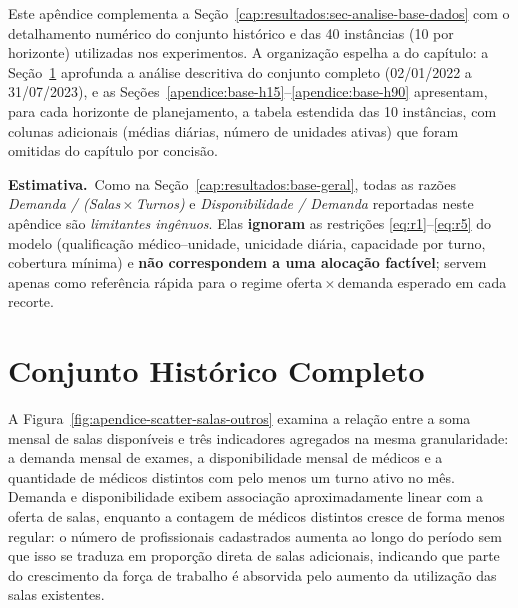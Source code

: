 Este apêndice complementa a Seção~\ref{cap:resultados:sec-analise-base-dados} com o detalhamento numérico do conjunto histórico e das 40 instâncias (10 por horizonte) utilizadas nos experimentos. A organização espelha a do capítulo: a Seção~\ref{apendice:base-geral-detalhe} aprofunda a análise descritiva do conjunto completo (02/01/2022 a 31/07/2023), e as Seções~\ref{apendice:base-h15}--\ref{apendice:base-h90} apresentam, para cada horizonte de planejamento, a tabela estendida das 10 instâncias, com colunas adicionais (médias diárias, número de unidades ativas) que foram omitidas do capítulo por concisão.

\noindent\textbf{Estimativa.}\, Como na Seção~\ref{cap:resultados:base-geral}, todas as razões \emph{Demanda / (Salas\,$\times$\,Turnos)} e \emph{Disponibilidade / Demanda} reportadas neste apêndice são \emph{limitantes ingênuos}. Elas \textbf{ignoram} as restrições \ref{eq:r1}--\ref{eq:r5} do modelo (qualificação médico--unidade, unicidade diária, capacidade por turno, cobertura mínima) e \textbf{não correspondem a uma alocação factível}; servem apenas como referência rápida para o regime oferta\,$\times$\,demanda esperado em cada recorte.

\section{Conjunto Histórico Completo}
\label{apendice:base-geral-detalhe}

A Figura~\ref{fig:apendice-scatter-salas-outros} examina a relação entre a soma mensal de salas disponíveis e três indicadores agregados na mesma granularidade: a demanda mensal de exames, a disponibilidade mensal de médicos e a quantidade de médicos distintos com pelo menos um turno ativo no mês. Demanda e disponibilidade exibem associação aproximadamente linear com a oferta de salas, enquanto a contagem de médicos distintos cresce de forma menos regular: o número de profissionais cadastrados aumenta ao longo do período sem que isso se traduza em proporção direta de salas adicionais, indicando que parte do crescimento da força de trabalho é absorvida pelo aumento da utilização das salas existentes.

\newpage


